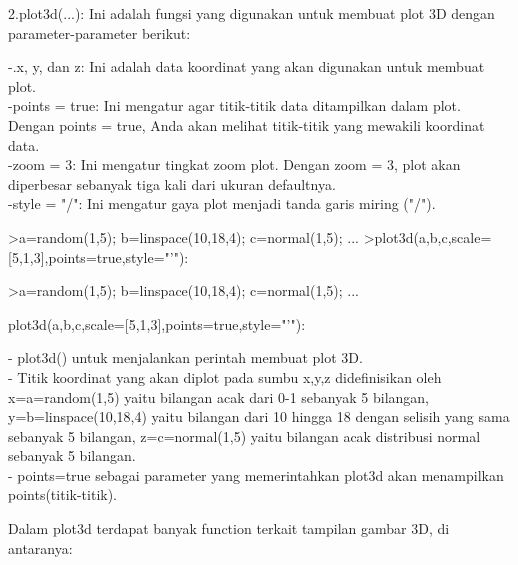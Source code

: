 \documentclass[a4paper,10pt]{article}
\begin{document}
\begin{eulernotebook}
\begin{eulercomment}
\begin{eulercomment}
\begin{eulercomment}
\begin{eulercomment}
\begin{eulercomment}
\begin{eulercomment}
\begin{eulercomment}
\begin{eulercomment}
\begin{eulercomment}
2.plot3d(...): Ini adalah fungsi yang digunakan untuk membuat plot 3D
dengan parameter-parameter berikut:

-.x, y, dan z: Ini adalah data koordinat yang akan digunakan untuk
membuat plot.\\
-points = true: Ini mengatur agar titik-titik data ditampilkan dalam
plot. Dengan points = true, Anda akan melihat titik-titik yang
mewakili koordinat data.\\
-zoom = 3: Ini mengatur tingkat zoom plot. Dengan zoom = 3, plot akan
diperbesar sebanyak tiga kali dari ukuran defaultnya.\\
-style = "/": Ini mengatur gaya plot menjadi tanda garis miring ("/").
\end{eulercomment}
\begin{eulerprompt}
>a=random(1,5); b=linspace(10,18,4); c=normal(1,5); ...
>plot3d(a,b,c,scale=[5,1,3],points=true,style="'"):
\end{eulerprompt}
\begin{eulercomment}
\textgreater{}a=random(1,5); b=linspace(10,18,4); c=normal(1,5); ...\\
\end{eulercomment}
\begin{eulerttcomment}
 plot3d(a,b,c,scale=[5,1,3],points=true,style="'"):
\end{eulerttcomment}
\begin{eulercomment}

- plot3d() untuk menjalankan perintah membuat plot 3D.\\
- Titik koordinat yang akan diplot pada sumbu x,y,z didefinisikan oleh
x=a=random(1,5) yaitu bilangan acak dari 0-1 sebanyak 5 bilangan,
y=b=linspace(10,18,4) yaitu bilangan dari 10 hingga 18 dengan selisih
yang sama sebanyak 5 bilangan, z=c=normal(1,5) yaitu bilangan acak
distribusi normal sebanyak 5 bilangan.\\
- points=true sebagai parameter yang memerintahkan plot3d akan
menampilkan points(titik-titik).
\end{eulercomment}
\begin{eulercomment}

\end{eulercomment}
\begin{eulercomment}
Dalam plot3d terdapat banyak function terkait tampilan gambar 3D, di
antaranya:


\end{eulercomment}
\end{eulercomment}
\end{eulercomment}
\end{eulercomment}
\end{eulercomment}
\end{eulercomment}
\end{eulercomment}
\end{eulercomment}
\end{eulercomment}
\end{eulernotebook}
\end{document}

